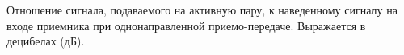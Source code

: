 Отношение сигнала, подаваемого на активную пару, к наведенному
сигналу на входе приемника при однонаправленной
приемо-передаче. Выражается в децибелах (дБ).